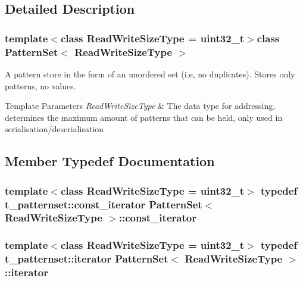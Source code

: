 \subsection{Detailed Description}
\subsubsection*{template$<$class Read\+Write\+Size\+Type = uint32\+\_\+t$>$class Pattern\+Set$<$ Read\+Write\+Size\+Type $>$}

A pattern store in the form of an unordered set (i.\+e, no duplicates). Stores only patterns, no values. 


\begin{DoxyTemplParams}{Template Parameters}
{\em Read\+Write\+Size\+Type} & The data type for addressing, determines the maximum amount of patterns that can be held, only used in serialisation/deserialisation \\
\hline
\end{DoxyTemplParams}


\subsection{Member Typedef Documentation}
\hypertarget{classPatternSet_a5d419991ea0abb0fbc4a2282574b1b8c}{}
\subsubsection[{const\+\_\+iterator}]{\setlength{\rightskip}{0pt plus 5cm}template$<$class Read\+Write\+Size\+Type = uint32\+\_\+t$>$ typedef t\+\_\+patternset\+::const\+\_\+iterator {\bf Pattern\+Set}$<$ Read\+Write\+Size\+Type $>$\+::{\bf const\+\_\+iterator}}\label{classPatternSet_a5d419991ea0abb0fbc4a2282574b1b8c}
\hypertarget{classPatternSet_a18b78ea966c57db2373741291ba610f3}{}
\subsubsection[{iterator}]{\setlength{\rightskip}{0pt plus 5cm}template$<$class Read\+Write\+Size\+Type = uint32\+\_\+t$>$ typedef t\+\_\+patternset\+::iterator {\bf Pattern\+Set}$<$ Read\+Write\+Size\+Type $>$\+::{\bf iterator}}\label{classPatternSet_a18b78ea966c57db2373741291ba610f3}


